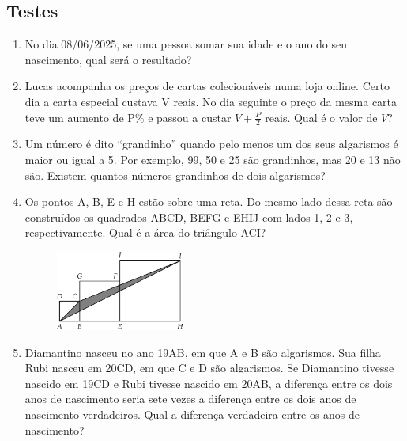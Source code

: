 \documentclass[12pt]{article}
\begin{document}
    \subsection{Testes}
      \begin{enumerate}[label=\textbf{\arabic*.}]
        \item No dia 08/06/2025, se uma pessoa somar sua idade e o ano do seu nascimento, qual será o resultado?
        \item Lucas acompanha os preços de cartas colecionáveis numa loja online. Certo dia a carta especial custava V reais. No dia seguinte 
          o preço da mesma carta teve um aumento de P\% e passou a custar \(V + \tfrac{P}{2}\) reais. Qual é o valor de \(V\)?
        \item Um número é dito “grandinho” quando pelo menos um dos seus algarismos é maior ou igual a 5. Por exemplo, 99, 50 e 25 são 
          grandinhos, mas 20 e 13 não são. Existem quantos números grandinhos de dois algarismos?
        \item Os pontos A, B, E e H estão sobre uma reta. Do mesmo lado dessa reta são construídos os quadrados ABCD, BEFG e EHIJ com lados
          1, 2 e 3, respectivamente. Qual é a área do triângulo ACI?
          \begin{figure}[h]
            \centering
            \includegraphics[width=0.4\textwidth]{first.png}
          \end{figure}
        \item Diamantino nasceu no ano 19AB, em que A e B são algarismos. Sua filha Rubi nasceu em 20CD, em que C e D são algarismos. Se
          Diamantino tivesse nascido em 19CD e Rubi tivesse nascido em 20AB, a diferença entre os dois anos de nascimento seria sete vezes a
          diferença entre os dois anos de nascimento verdadeiros. Qual a diferença verdadeira entre os anos de nascimento?


\end{enumerate}
\end{document}
